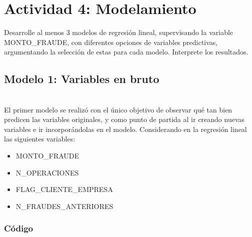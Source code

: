 \documentclass[
	11pt, %
	spanish, %
]{fphw}
\begin{document}
\newpage
\section*{Actividad 4: Modelamiento}

\begin{problem}

Desarrolle al menos 3 modelos de regresión lineal, supervisando la variable MONTO\_FRAUDE, con diferentes opciones de variables predictivas, argumentando la selección de estas para cada modelo. Interprete los resultados.

\end{problem}

\subsection*{Modelo 1: Variables en bruto}
\hfill\\
El primer modelo se realizó con el único objetivo de observar qué tan bien predicen las variables originales, y como punto de partida al ir creando nuevas variables e ir incorporándolas en el modelo. Considerando en la regresión lineal las siguientes variables:
\begin{itemize}
\item MONTO\_FRAUDE
\item N\_OPERACIONES
\item FLAG\_CLIENTE\_EMPRESA
\item N\_FRAUDES\_ANTERIORES
\end{itemize}

\subsubsection*{Código} \hfill \\

\end{document}
